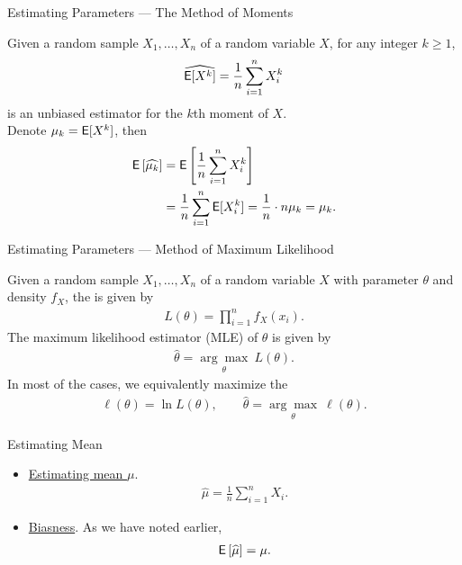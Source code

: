 \begin{frame}{Estimating Parameters --- The Method of Moments}

\justifying
{} Given a random sample $X_1, \ldots, X_n$ of a random variable $X$, for any integer $k\geq 1$, 
\begin{align*}
\widehat{\mathsf{E}[X^k]} = \frac{1}{n}\sum_{i=1}^n X_i^k
\end{align*}
is an unbiased estimator for the $k$th moment of $X$. \\
 Denote $\mu_k = \mathsf{E}[X^k]$, then
\begin{align*}
\mathsf{E}\left[\widehat{\mu_k} \right] & = \mathsf{E}\left[\frac{1}{n}\sum_{i=1}^n X_i^k \right] \\
& = \frac{1}{n}\sum_{i=1}^n \mathsf{E}[X_i^k] = \frac{1}{n} \cdot n \mu_k = \mu_k.
\end{align*}


\end{frame}


\begin{frame}{Estimating Parameters --- Method of Maximum Likelihood}

\justifying
{} Given a random sample $X_1, \ldots, X_n$ of a random variable $X$ with parameter $\theta$ and density $f_X$, the  is given by
\begin{align*}
L(\theta) = \prod_{i=1}^n f_{X}(x_i).
\end{align*}
The maximum likelihood estimator (MLE) of $\theta$ is given by
\begin{align*}
\widehat{\theta} = \underset{\theta}{\arg\max}\ L(\theta).
\end{align*}
In most of the cases, we equivalently maximize the 
\begin{align*}
\ell(\theta) = \ln L(\theta), \qquad \widehat{\theta} = \underset{\theta}{\arg\max}\ \ell(\theta).
\end{align*}


\end{frame}


\begin{frame}{Estimating Mean}

\begin{itemize}
	\justifying
	\item \underline{Estimating mean $\mu$}.
	\begin{align*}
	\widehat{\mu} = \frac{1}{n}\sum_{i=1}^n X_i.
	\end{align*}
	\item \underline{Biasness}. As we have noted earlier,
	\begin{align*}
	\mathsf{E}\left[\widehat{\mu}\right] = \mu.
	\end{align*}
\end{itemize}

\end{frame}

